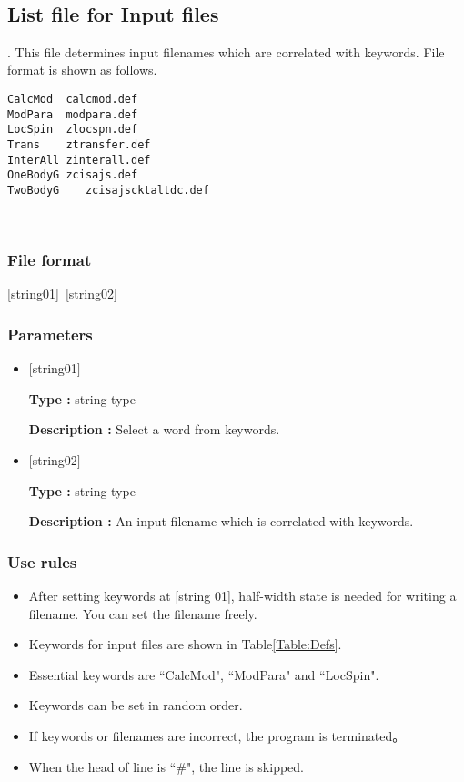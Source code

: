 ~\subsection{List file for Input files}
\label{Subsec:InputFileList}.
This file determines input filenames which are correlated with keywords. File format is shown as follows.\\
\begin{minipage}{10cm}
\begin{screen}
\begin{verbatim}
CalcMod  calcmod.def
ModPara  modpara.def
LocSpin  zlocspn.def
Trans    ztransfer.def
InterAll zinterall.def
OneBodyG zcisajs.def
TwoBodyG	zcisajscktaltdc.def
\end{verbatim}
\end{screen}
\end{minipage}
\\
\subsubsection{File format}
[string01]~[string02]
\subsubsection{Parameters}
 \begin{itemize}
   \item  $[$string01$]$
   
   {\bf Type :} string-type
   
   {\bf Description :} Select a word from keywords.
   
   \item  $[$string02$]$
   
    {\bf Type :} string-type 

   {\bf Description :} An input filename which is correlated with keywords.
 \end{itemize}
\subsubsection{Use rules}
\begin{itemize}
\item  After setting keywords at [string 01], half-width state is needed for writing a filename. You can set the filename freely.
\item Keywords for input files are shown in Table\ref{Table:Defs}.
\item Essential keywords are ``CalcMod", ``ModPara" and ``LocSpin".
\item Keywords can be set in random order.
\item If keywords or filenames are incorrect, the program is terminated。
\item When the head of line is ``$\#$", the line is skipped.
\end{itemize}

